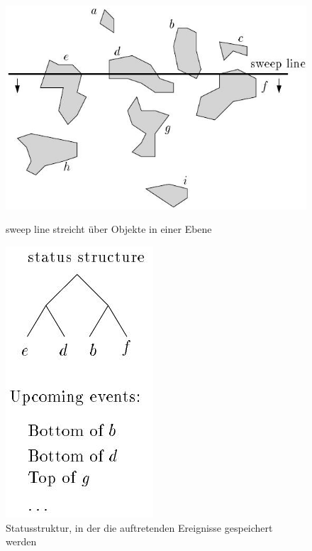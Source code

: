 \begin{figure}[!ht]
\begin{minipage}{0.55\textwidth}
\centering
\includegraphics[scale=0.62]{bilder/sweep}
\caption{sweep line streicht über Objekte in einer Ebene}
\label{sweep}
\end{minipage}
\hfill
\begin{minipage}{0.4\textwidth}
\centering
\includegraphics[scale=0.67]{bilder/statstruc}
\caption{Statusstruktur, in der die auftretenden Ereignisse gespeichert werden}
\label{stat}
\end{minipage}
\end{figure}

